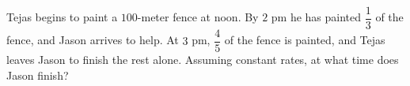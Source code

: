 Tejas begins to paint a $100$-meter fence at noon. By $2$ pm he has painted $\dfrac{1}{3}$ of the fence, and Jason arrives to help. At $3$ pm, $\dfrac{4}{5}$ of the fence is painted, and Tejas leaves Jason to finish the rest alone. Assuming constant rates, at what time does Jason finish?
